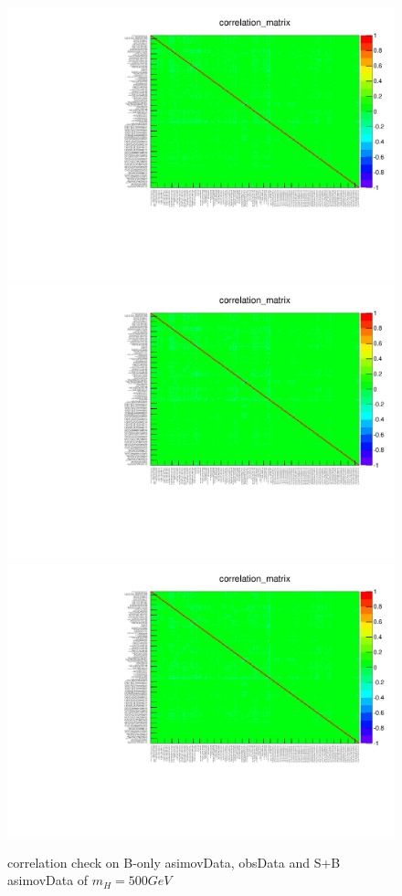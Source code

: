 \begin{figure}
\includegraphics[width=.4\textwidth, angle=-90]{fig/Statistical/combination/corr-exp-combined-mH500.pdf}
\includegraphics[width=.4\textwidth, angle=-90]{fig/Statistical/combination/corr-obs-combined-mH500.pdf}\\
\includegraphics[width=.4\textwidth, angle=-90]{fig/Statistical/combination/corr-exp-combined-mH500_mu1.pdf}
\caption{correlation check on B-only asimovData, obsData and S+B asimovData of $m_{H}=500 GeV$}
\label{fig:corr-comb-500}
\end{figure}

